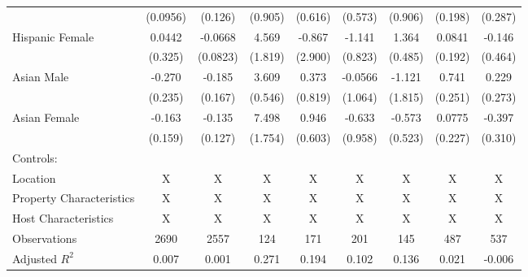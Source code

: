 \begin{landscape}
{\begin{longtable}{l*{8}{c}}
                    &    (0.0956)         &     (0.126)         &     (0.905)         &     (0.616)         &     (0.573)         &     (0.906)         &     (0.198)         &     (0.287)         \\
Hispanic Female     &      0.0442         &     -0.0668         &       4.569\sym{*}  &      -0.867         &      -1.141         &       1.364\sym{**} &      0.0841         &      -0.146         \\
                    &     (0.325)         &    (0.0823)         &     (1.819)         &     (2.900)         &     (0.823)         &     (0.485)         &     (0.192)         &     (0.464)         \\
Asian Male          &      -0.270         &      -0.185         &       3.609\sym{***}&       0.373         &     -0.0566         &      -1.121         &       0.741\sym{**} &       0.229         \\
                    &     (0.235)         &     (0.167)         &     (0.546)         &     (0.819)         &     (1.064)         &     (1.815)         &     (0.251)         &     (0.273)         \\
Asian Female        &      -0.163         &      -0.135         &       7.498\sym{***}&       0.946         &      -0.633         &      -0.573         &      0.0775         &      -0.397         \\
                    &     (0.159)         &     (0.127)         &     (1.754)         &     (0.603)         &     (0.958)         &     (0.523)         &     (0.227)         &     (0.310)         \\
\hline
Controls:        \\
\hspace{3mm} Location  &                           X      & X & X & X & X & X &  X & X \\
\hspace{3mm} Property Characteristics  &   X  & X & X & X & X & X &  X & X \\
\hspace{3mm} Host Characteristics  &         X& X & X & X & X & X &  X & X \\
\hline
Observations        &        2690         &        2557         &         124         &         171         &         201         &         145         &         487         &         537         \\
Adjusted \(R^{2}\)  &       0.007         &       0.001         &       0.271         &       0.194         &       0.102         &       0.136         &       0.021         &      -0.006         \\

\end{longtable}}
\end{landscape}
